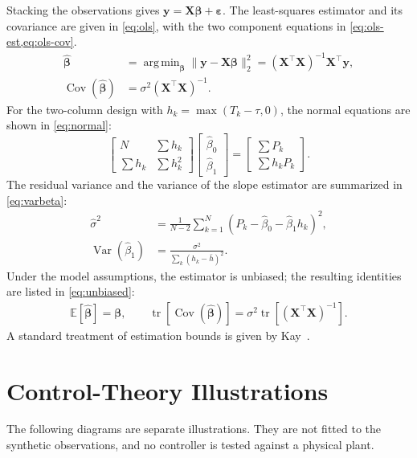 \documentclass[journal]{IEEEtran}
\DeclareMathOperator*{\argmin}{arg\,min}
\DeclareMathOperator{\Var}{Var}
\DeclareMathOperator{\Cov}{Cov}
\DeclareMathOperator{\tr}{tr}
\newcommand{\E}{\mathbb{E}}
\begin{document}
Stacking the observations gives $\bm y=\bm X\bm\beta+\bm\varepsilon$. The least-squares estimator and its covariance are given in \cref{eq:ols}, with the two component equations in \cref{eq:ols-est,eq:ols-cov}.
\begin{subequations}\label{eq:ols}
\begin{align}
  \hat{\bm\beta}
    &=\argmin_{\bm\beta}\lVert\bm y-\bm X\bm\beta\rVert_2^2
      =(\bm X^{\top}\bm X)^{-1}\bm X^{\top}\bm y,
      \label{eq:ols-est}\\
  \Cov(\hat{\bm\beta})
    &=\sigma^2(\bm X^{\top}\bm X)^{-1}.
      \label{eq:ols-cov}
\end{align}
\end{subequations}
For the two-column design with $h_k=\max(T_k-\tau,0)$, the normal equations are shown in \cref{eq:normal}:
\begin{equation}
  \begin{bmatrix}
    N & \sum h_k\\
    \sum h_k & \sum h_k^2
  \end{bmatrix}
  \begin{bmatrix}\hat\beta_0\\\hat\beta_1\end{bmatrix}
  =
  \begin{bmatrix}\sum P_k\\\sum h_kP_k\end{bmatrix}.
  \label{eq:normal}
\end{equation}
The residual variance and the variance of the slope estimator are summarized in \cref{eq:varbeta}:
\begin{align}
  \hat\sigma^2
    &=\frac{1}{N-2}\sum_{k=1}^N
      (P_k-\hat\beta_0-\hat\beta_1h_k)^2,
      \nonumber\\
  \Var(\hat\beta_1)
    &=\frac{\sigma^2}{\sum_k(h_k-\bar h)^2}.
      \label{eq:varbeta}
\end{align}
Under the model assumptions, the estimator is unbiased; the resulting identities are listed in \cref{eq:unbiased}:
\begin{gather}
  \E[\hat{\bm\beta}]=\bm\beta,\qquad
  \tr\!\left[\Cov(\hat{\bm\beta})\right]
    =\sigma^2\tr\!\left[(\bm X^{\top}\bm X)^{-1}\right].
    \label{eq:unbiased}
\end{gather}
A standard treatment of estimation bounds is given by Kay~\cite{kay1993estimation}.

\section{Control-Theory Illustrations}\label{sec:control}
The following diagrams are separate illustrations. They are not fitted to the synthetic observations, and no controller is tested against a physical plant.
\end{document}
